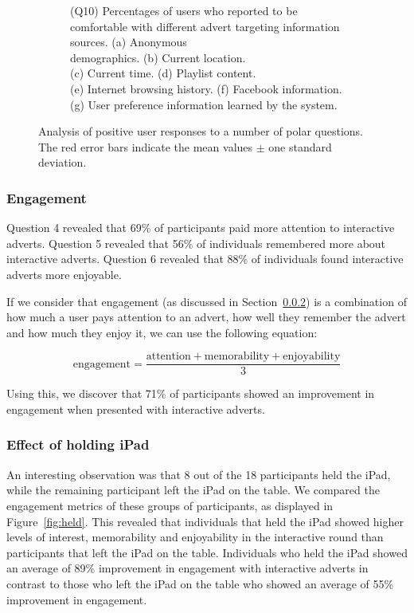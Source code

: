 \begin{figure}[!ht]
\begin{subfigure}[t]{0.49\textwidth}
			\caption{(Q10) Percentages of users who reported to be comfortable with different advert targeting information sources. (a) Anonymous \\demographics. (b) Current location. \\(c) Current time. (d) Playlist content. \\(e) Internet browsing history. (f) Facebook information. (g) User preference information learned by the system.}
		\end{subfigure}
		\caption{Analysis of positive user responses to a number of polar questions. The red error bars indicate the mean values $\pm$ one standard deviation.}
		\label{fig:qualitative_results}
	\end{figure}



	\subsubsection{Engagement}

	Question 4 revealed that 69\% of participants paid more attention to interactive adverts. Question 5 revealed that 56\% of individuals remembered more about interactive adverts. Question 6 revealed that 88\% of individuals found interactive adverts more enjoyable. 

	If we consider that engagement (as discussed in Section~\ref{}) is a combination of how much a user pays attention to an advert, how well they remember the advert and how much they enjoy it, we can use the following equation:

	$$
	\text{engagement} = \frac{\text{attention} + \text{memorability} + \text{enjoyability}}{3}
	$$

	Using this, we discover that 71\% of participants showed an improvement in engagement when presented with interactive adverts.

	\subsubsection{Effect of holding iPad}

	An interesting observation was that 8 out of the 18 participants held the iPad, while the remaining participant left the iPad on the table. We compared the engagement metrics of these groups of participants, as displayed in Figure~\ref{fig:held}. This revealed that individuals that held the iPad showed higher levels of interest, memorability and enjoyability in the interactive round than participants that left the iPad on the table. Individuals who held the iPad showed an average of 89\% improvement in engagement with interactive adverts in contrast to those who left the iPad on the table who showed an average of 55\% improvement in engagement.

